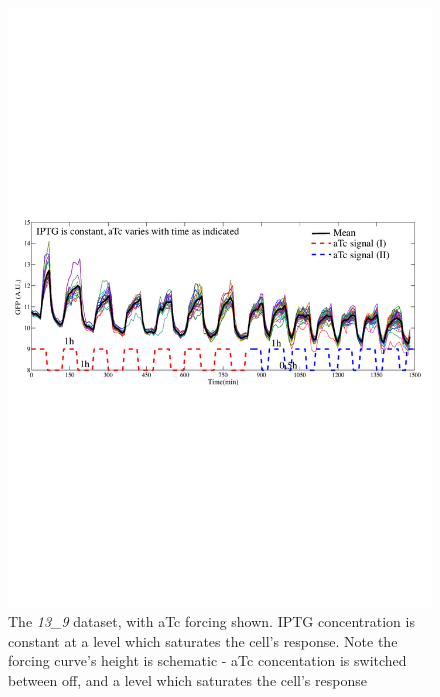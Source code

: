 \documentclass[10pt,journal]{./IEEE_latex_class/IEEEtran}
\begin{document}
\begin{figure}[h]
\centering
\includegraphics[trim = 0 310 0 300 , scale = 0.5, clip = true]{13_9}
\caption{The \textit{13\_9} dataset, with aTc forcing shown. IPTG concentration is constant at a level which saturates the cell's response. Note the forcing curve's height is schematic - aTc concentation is switched between off, and a level which saturates the cell's response}
\label{reactionscheme}
\end{figure}
\end{document}
